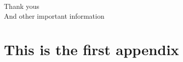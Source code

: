 \documentclass[12pt, a4paper, twoside]{book} %
\begin{document}
	{\centering Thank yous\\}
	\vfill %
	And other important information

	\cleardoublepage
	
	\tableofcontents %
	\listoffigures %
	\listoftables %
	\lstlistoflistings %
	
	\cleardoublepage %
	
	\mainmatter 
	
	\pagestyle{fancy}
	
	
	
	\appendix
	
	\chapter{This is the first appendix}
	
	\cleardoublepage
	
	\printbibliography[heading=bibintoc] %
	
	\backmatter
	
\end{document}
